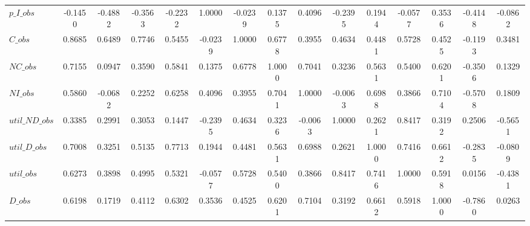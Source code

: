 \begin{center}
\begin{longtable}{lcccccccccccccc}
$p\_I\_obs      $	 & 	          -0.1450	 & 	          -0.4882	 & 	          -0.3563	 & 	          -0.2232	 & 	           1.0000	 & 	          -0.0239	 & 	           0.1375	 & 	           0.4096	 & 	          -0.2395	 & 	           0.1944	 & 	          -0.0577	 & 	           0.3536	 & 	          -0.4148	 & 	          -0.0862 \\ 
$C\_obs         $	 & 	           0.8685	 & 	           0.6489	 & 	           0.7746	 & 	           0.5455	 & 	          -0.0239	 & 	           1.0000	 & 	           0.6778	 & 	           0.3955	 & 	           0.4634	 & 	           0.4481	 & 	           0.5728	 & 	           0.4525	 & 	          -0.1193	 & 	           0.3481 \\ 
$NC\_obs        $	 & 	           0.7155	 & 	           0.0947	 & 	           0.3590	 & 	           0.5841	 & 	           0.1375	 & 	           0.6778	 & 	           1.0000	 & 	           0.7041	 & 	           0.3236	 & 	           0.5631	 & 	           0.5400	 & 	           0.6201	 & 	          -0.3506	 & 	           0.1329 \\ 
$NI\_obs        $	 & 	           0.5860	 & 	          -0.0682	 & 	           0.2252	 & 	           0.6258	 & 	           0.4096	 & 	           0.3955	 & 	           0.7041	 & 	           1.0000	 & 	          -0.0063	 & 	           0.6988	 & 	           0.3866	 & 	           0.7104	 & 	          -0.5708	 & 	           0.1809 \\ 
$util\_ND\_obs  $	 & 	           0.3385	 & 	           0.2991	 & 	           0.3053	 & 	           0.1447	 & 	          -0.2395	 & 	           0.4634	 & 	           0.3236	 & 	          -0.0063	 & 	           1.0000	 & 	           0.2621	 & 	           0.8417	 & 	           0.3192	 & 	           0.2506	 & 	          -0.5651 \\ 
$util\_D\_obs   $	 & 	           0.7008	 & 	           0.3251	 & 	           0.5135	 & 	           0.7713	 & 	           0.1944	 & 	           0.4481	 & 	           0.5631	 & 	           0.6988	 & 	           0.2621	 & 	           1.0000	 & 	           0.7416	 & 	           0.6612	 & 	          -0.2835	 & 	          -0.0809 \\ 
$util\_obs      $	 & 	           0.6273	 & 	           0.3898	 & 	           0.4995	 & 	           0.5321	 & 	          -0.0577	 & 	           0.5728	 & 	           0.5400	 & 	           0.3866	 & 	           0.8417	 & 	           0.7416	 & 	           1.0000	 & 	           0.5918	 & 	           0.0156	 & 	          -0.4381 \\ 
$D\_obs         $	 & 	           0.6198	 & 	           0.1719	 & 	           0.4112	 & 	           0.6302	 & 	           0.3536	 & 	           0.4525	 & 	           0.6201	 & 	           0.7104	 & 	           0.3192	 & 	           0.6612	 & 	           0.5918	 & 	           1.0000	 & 	          -0.7860	 & 	           0.0263 \\ 

\end{longtable}
\end{center}
